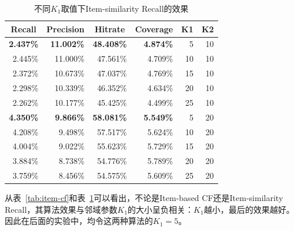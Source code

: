 \begin{table}[htbp]
	\centering
	\caption{不同$K_1$取值下Item-similarity Recall的效果}
	\begin{tabular}{rrrrrr}
		\toprule
		\multicolumn{1}{c}{Recall} & \multicolumn{1}{c}{Precision} & \multicolumn{1}{c}{Hit\;rate} & \multicolumn{1}{c}{Coverage} & \multicolumn{1}{c}{K1} & \multicolumn{1}{c}{K2} \\
		\midrule
		\textbf{2.437\%} & \textbf{11.002\%} & \textbf{48.408\%} & \textbf{4.874\%} & 5    & 10 \\
		2.445\% & 11.000\% & 47.561\% & 4.709\% & 10   & 10 \\
		2.372\% & 10.673\% & 47.037\% & 4.769\% & 15   & 10 \\
		2.298\% & 10.339\% & 46.352\% & 4.634\% & 20   & 10 \\
		2.262\% & 10.177\% & 45.425\% & 4.499\% & 25   & 10 \\
		\textbf{4.350\%} & \textbf{9.866\%} & \textbf{58.081\%} & \textbf{5.549\%} & 5    & 20 \\
		4.208\% & 9.498\% & 57.517\% & 5.624\% & 10   & 20 \\
		4.004\% & 9.022\% & 55.623\% & 5.729\% & 15   & 20 \\
		3.884\% & 8.738\% & 54.776\% & 5.789\% & 20   & 20 \\
		3.759\% & 8.456\% & 54.575\% & 5.609\% & 25   & 20 \\
		\bottomrule
	\end{tabular}%
	\label{tab:item-similarity}%
\end{table}%

从表~\ref{tab:item-cf}和表~\ref{tab:item-similarity}可以看出，不论是Item-based CF还是Item-similarity Recall，其算法效果与邻域参数$K_1$的大小呈负相关：$K_1$越小，最后的效果越好。因此在后面的实验中，均令这两种算法的$K_1=5$。

